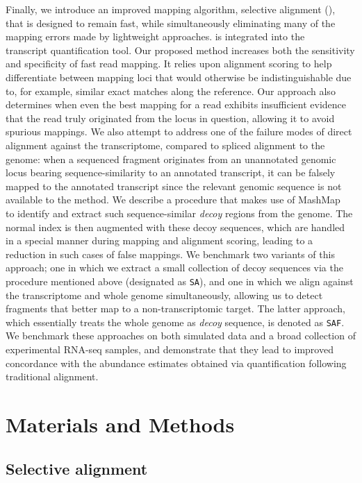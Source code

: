 Finally, we introduce an improved mapping algorithm, selective alignment (\hsa),
that is designed to remain fast, while simultaneously eliminating many of the
mapping errors made by lightweight approaches. \hsa is integrated into the \salmon~\cite{salmon}
transcript quantification tool. Our proposed method increases
both the sensitivity and specificity of fast read mapping. It relies upon
alignment scoring to help differentiate between mapping loci that would
otherwise be indistinguishable due to, for example, similar exact matches along
the reference. Our approach also determines when even the best mapping for a
read exhibits insufficient evidence that the read truly originated from the
locus in question, allowing it to avoid spurious mappings. 
We also attempt to address one of the failure modes of direct alignment against
  the transcriptome, compared to spliced alignment to the genome: when a sequenced fragment originates
  from an unannotated genomic locus bearing sequence-similarity to an annotated
  transcript, it can be falsely mapped to the annotated transcript since the
  relevant genomic sequence is not available to the method. We describe a procedure
  that makes use of MashMap~\cite{jain2018fast} to identify and extract such
  sequence-similar \emph{decoy} regions from the genome. The normal \salmon
  index is then augmented with these decoy sequences, which are handled in a
  special manner during mapping and alignment scoring, leading to a reduction in
  such cases of false mappings. We benchmark two variants of this approach; one in which
we extract a small collection of decoy sequences via the procedure mentioned
above (designated as \texttt{SA}), and one in which we align against the
transcriptome and whole genome simultaneously, allowing us to detect fragments
that better map to a non-transcriptomic target.  The latter approach, which 
essentially treats the whole genome as \emph{decoy} sequence, is denoted as 
\texttt{SAF}. We benchmark these approaches on both simulated data and a broad collection of
experimental RNA-seq samples, and demonstrate that they lead to improved
concordance with the abundance estimates obtained via quantification
following traditional alignment.


\section{Materials and Methods}
\subsection{Selective alignment}
\label{subsec:meth_sa}

